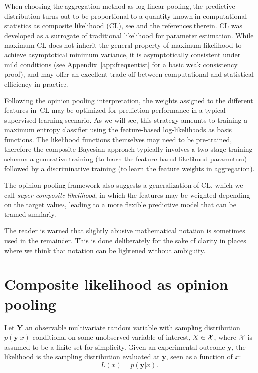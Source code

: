 \documentclass[english]{scrartcl}
\def\y{{\mathbf{y}}}
\begin{document}

When choosing the aggregation method as log-linear pooling, the predictive distribution turns out to be proportional to a quantity known in computational statistics as composite likelihood (CL), see \cite{Varin-11} and the references therein. CL was developed as a surrogate of traditional likelihood for parameter estimation. While maximum CL does not inherit the general property of maximum likelihood to achieve asymptotical minimum variance, it is asymptotically consistent under mild conditions \cite{Xu-11} (see Appendix~\ref{app:frequentist} for a basic weak consistency proof), and may offer an excellent trade-off between computational and statistical efficiency in practice.

Following the opinion pooling interpretation, the weights assigned to the different features in~CL may be optimized for prediction performance in a typical supervised learning scenario. As we will see, this strategy amounts to training a maximum entropy classifier using the feature-based log-likelihoods as basis functions. The likelihood functions themselves may need to be pre-trained, therefore the composite Bayesian approach typically involves a two-stage training scheme: a generative training (to learn the feature-based likelihood parameters) followed by a discriminative training (to learn the feature weights in aggregation).

The opinion pooling framework also suggests a generalization of CL, which we call {\em super composite likelihood}, in which the features may be weighted depending on the target values, leading to a more flexible predictive model that can be trained similarly.


The reader is warned that slightly abusive mathematical notation is sometimes used in the remainder. This is done deliberately for the sake of clarity in places where we think that notation can be lightened without ambiguity. 


\section{Composite likelihood as opinion pooling}
\label{sec:log_pool}

Let $\mathbf{Y}$ an observable multivariate random variable with sampling distribution $p(\y|x)$ conditional on some unobserved variable of interest, $X\in{\cal X}$, where ${\cal X}$ is assumed to be a finite set for simplicity. Given an experimental outcome $\y$, the likelihood is the sampling distribution evaluated at $\y$, seen as a function of $x$:
$$
L(x) = p(\y|x)
.
$$
\end{document}
